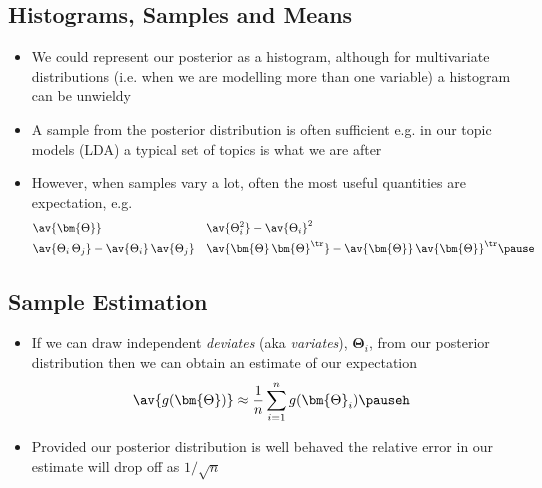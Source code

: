 \begin{slide}
\section{Histograms, Samples and Means}

\begin{PauseHighLight}
  \begin{itemize}
  \item We could represent our posterior as a histogram, although for
    multivariate distributions (i.e. when we are modelling more than one
    variable) a histogram can be unwieldy\pause
  \item A sample from the posterior distribution is often sufficient
    e.g. in our topic models (LDA) a typical set of topics is what we
    are after\pause
  \item However, when samples vary a lot, often the most useful quantities
    are expectation, e.g.
    \begin{align*}
      &\av{\bm{\Theta}} & &\av{\Theta_i^2}-\av{\Theta_i}^2 \\
      &\av{\Theta_i\,\Theta_j} - \av{\Theta_i}\,\av{\Theta_j}
      && \av{\bm{\Theta}\,\bm{\Theta}^\tr} -\av{\bm{\Theta}}\,\av{\bm{\Theta}}^\tr\pause
    \end{align*}
  \end{itemize}
\end{PauseHighLight}

\end{slide}




\begin{slide}
\section[-2]{Sample Estimation}

\pb\pause{}
\begin{itemize}
\item If we can draw independent \emph{deviates} (aka
  \emph{variates}), $\bm{\Theta}_i$, from our posterior distribution then we can
  obtain an estimate of our expectation
  \begin{align*}
    \av{g(\bm{\Theta})} \approx \frac{1}{n} \sum_{i=1}^n g(\bm{\Theta}_i)\pauseh
  \end{align*}
\item Provided our posterior distribution is well behaved the
  relative error in our estimate will drop off as $1/\sqrt{n}$\pauseh
  \begin{center}
    \pause   
  \end{center}
\end{itemize}

\end{slide}

